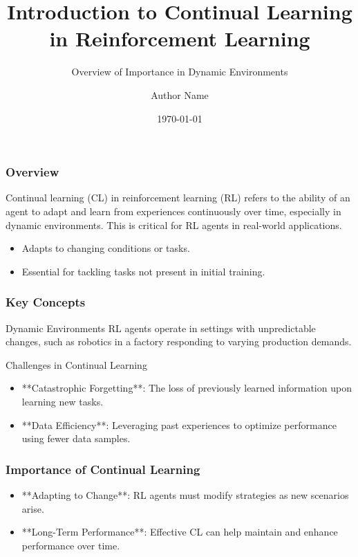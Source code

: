 \documentclass[aspectratio=169]{beamer}
\begin{document}
\frame{\titlepage}

\begin{frame}[fragile]
    \title{Introduction to Continual Learning in Reinforcement Learning}
    \subtitle{Overview of Importance in Dynamic Environments}
    \author{Author Name}
    \date{\today}
    \titlepage
\end{frame}

\begin{frame}[fragile]
    \frametitle{Overview}
    Continual learning (CL) in reinforcement learning (RL) refers to the ability of an agent to adapt and learn from experiences continuously over time, especially in dynamic environments. This is critical for RL agents in real-world applications.

    \begin{itemize}
        \item Adapts to changing conditions or tasks.
        \item Essential for tackling tasks not present in initial training.
    \end{itemize}
\end{frame}

\begin{frame}[fragile]
    \frametitle{Key Concepts}
    \begin{block}{Dynamic Environments}
        RL agents operate in settings with unpredictable changes, such as robotics in a factory responding to varying production demands.
    \end{block}
    
    \begin{block}{Challenges in Continual Learning}
        \begin{itemize}
            \item **Catastrophic Forgetting**: The loss of previously learned information upon learning new tasks.
            \item **Data Efficiency**: Leveraging past experiences to optimize performance using fewer data samples.
        \end{itemize}
    \end{block}
\end{frame}

\begin{frame}[fragile]
    \frametitle{Importance of Continual Learning}
    \begin{itemize}
        \item **Adapting to Change**: RL agents must modify strategies as new scenarios arise.
        \item **Long-Term Performance**: Effective CL can help maintain and enhance performance over time.
    \end{itemize}
\end{frame}
\end{document}
